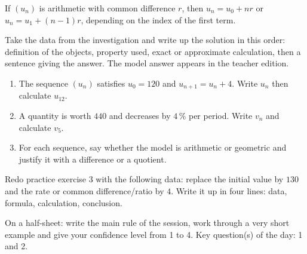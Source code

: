\begin{traceecrite}If $(u_n)$ is arithmetic with common difference $r$, then $u_n=u_0+nr$ or $u_n=u_1+(n-1)r$, depending on the index of the first term.\end{traceecrite}

\begin{exemple}
Take the data from the investigation and write up the solution in this order: definition of the objects, property used, exact or approximate calculation, then a sentence giving the answer. The model answer appears in the teacher edition.
\end{exemple}

\begin{exercice}[-- essential]
\begin{enumerate}\item The sequence $(u_n)$ satisfies $u_0=120$ and $u_{n+1}=u_n+4$. Write $u_n$ then calculate $u_{12}$.\item A quantity is worth $440$ and decreases by $4\,\%$ per period. Write $v_n$ and calculate $v_5$.\item For each sequence, say whether the model is arithmetic or geometric and justify it with a difference or a quotient.\end{enumerate}
\end{exercice}


\begin{dm}Redo practice exercise 3 with the following data: replace the initial value by $130$ and the rate or common difference/ratio by $4$. Write it up in four lines: data, formula, calculation, conclusion.\end{dm}

\begin{sortie}On a half-sheet: write the main rule of the session, work through a very short example and give your confidence level from 1 to 4. Key question(s) of the day: 1 and 2.\end{sortie}

